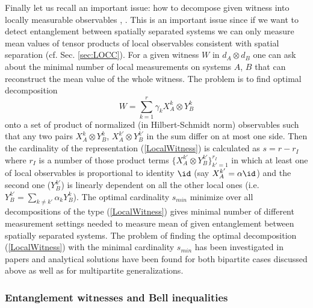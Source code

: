 \documentclass[rmp,12pt,preprint]{revtex4-2}
\begin{document}
Finally let us recall an important issue: how to decompose given
witness into locally measurable observables
\cite{GuehneLocalMeasurementWitness}, \cite{GuehneHBE_s}. This is an
important issue since if we want to detect entanglement between
spatially separated systems we can only measure mean values of tensor
products of local observables consistent with spatial separation
(cf. Sec. \ref{sec:LOCC}). For a given witness $W$ in $d_{A}\otimes
d_{B}$ one can ask about the minimal number of local measurements on
systems $A$, $B$ that can reconstruct the mean value of the whole
witness. The problem is to find optimal decomposition
\begin{equation}
W=\sum_{k=1}^{r} \gamma_{k} X_{A}^{k} \otimes Y_{B}^{k}
\label{LocalWitness}
\end{equation}
onto a set of product of normalized (in Hilbert-Schmidt norm)
observables such that any two pairs $X_{A}^{k} \otimes Y_{B}^{k}$,
$X_{A}^{k'} \otimes Y_{B}^{k'}$ in the sum differ on at most one
side. Then the cardinality of the representation (\ref{LocalWitness})
is calculated as $s=r-r_{I}$ where $r_{I}$ is a number of those
product terms $\{ X_{A}^{k'} \otimes Y_{B}^{k'}\}_{k'=1}^{r_{I}}$ in
which at least one of local observables is proportional to identity
$\id$ (say $X_{A}^{k'}=\alpha \id$) and the second one ($Y_{B}^{k'}$)
is linearly dependent on all the other local ones (i.e. $
Y_{B}^{k'}=\sum_{k\neq k'} \alpha_k Y_{B}^{k}$). The optimal
cardinality $s_{min}$ minimize over all decompositions of the type
(\ref{LocalWitness}) gives minimal number of different measurement
settings needed to measure mean of given entanglement between
spatially separated systems. The problem of finding the optimal
decomposition (\ref{LocalWitness}) with the minimal cardinality
$s_{min}$ has been investigated in papers
\cite{GuehneLocalMeasurementWitness,GuehneHBE_s} and analytical
solutions have been found for both bipartite cases discussed above as
well as for multipartite generalizations.



\subsubsection { Entanglement witnesses and Bell inequalities}
\label{subsec:Bell_witness}
\end{document}
